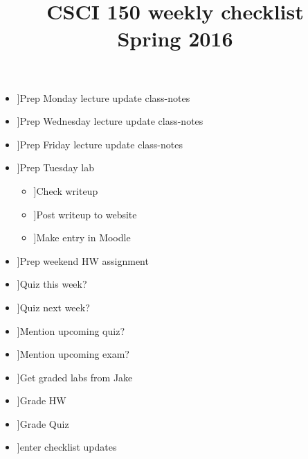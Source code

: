 \documentclass{article}
\title{CSCI 150 weekly checklist \\ {\small Spring 2016}}
\date{}
\newcommand{\cbox}{\framebox[1em]{\phantom{x}}}
\newcommand{\ci}{\item[\cbox]}
\newcommand{\also}{\cbox \hspace{1ex}}
\begin{document}
\maketitle
\thispagestyle{empty}

\begin{itemize}
\ci Prep Monday lecture \also update class-notes
\ci Prep Wednesday lecture \also update class-notes
\ci Prep Friday lecture \also update class-notes \\

\ci Prep Tuesday lab
\begin{itemize}
\ci Check writeup
\ci Post writeup to website
\ci Make entry in Moodle
\end{itemize}
\ci Prep weekend HW assignment \\

\ci Quiz this week?
\ci Quiz next week?
\ci Mention upcoming quiz?
\ci Mention upcoming exam? \\

\ci Get graded labs from Jake
\ci Grade HW
\ci Grade Quiz \\

\ci enter checklist updates
\end{itemize}
\end{document}
